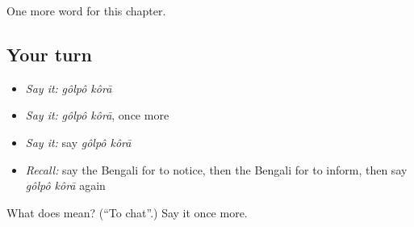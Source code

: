 \begin{grammarlens}[title={What you've built}]
One more word for this chapter.
\end{grammarlens}

\subsection*{Your turn}
\begin{itemize}
\raggedright
  \item \emph{Say it:} \emph{gôlpô kôrā}
  \item \emph{Say it:} \emph{gôlpô kôrā}, once more
  \item \emph{Say it:} say \emph{gôlpô kôrā}
  \item \emph{Recall:} say the Bengali for to notice, then the Bengali for to inform, then say \emph{gôlpô kôrā} again
\end{itemize}

\begin{tcolorbox}[breakable,colback=teal!4,colframe=teal!35!black,title={Before you move on}]
What does   mean? (\textquotedblleft{}To chat\textquotedblright{}.) Say it once more.
\end{tcolorbox}
